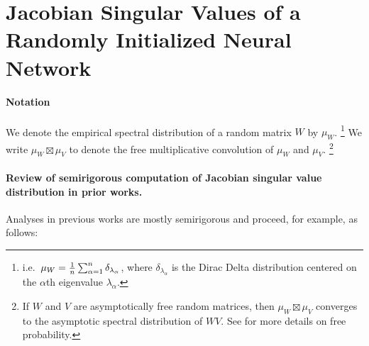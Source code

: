 \documentclass[main.tex]{subfiles}
\begin{document}
\newcommand{\mump}{\mu_{\mathrm{mp}}}

\newcommand{\Spec}[1]{\mu_{#1}}

\section{Jacobian Singular Values of a Randomly Initialized Neural Network}
\label{sec:jac}

\paragraph{Notation}
We denote the empirical spectral distribution of a random matrix $W$ by $\Spec{W}$.%
\footnote{i.e.\ $\Spec{W} = \f 1 n \sum_{\alpha=1}^n \delta_{\lambda_\alpha}$, where $\delta_{\lambda_\alpha}$ is the Dirac Delta distribution centered on the $\alpha$th eigenvalue $\lambda_\alpha$.}
We write $\mu_W \boxtimes \mu_V$ to denote the free multiplicative convolution of $\mu_W$ and $\mu_V$.%
\footnote{
  If $W$ and $V$ are asymptotically free random matrices, then $\mu_W \boxtimes \mu_V$ converges to the asymptotic spectral distribution of $WV$.
  See \citet{speicher_free_2009} for more details on free probability.
}

\paragraph*{Review of semirigorous computation of Jacobian singular value distribution in prior works.}

Analyses in previous works \citep{pennington_resurrecting_2017} are mostly semirigorous and proceed, for example, as follows:
\end{document}
